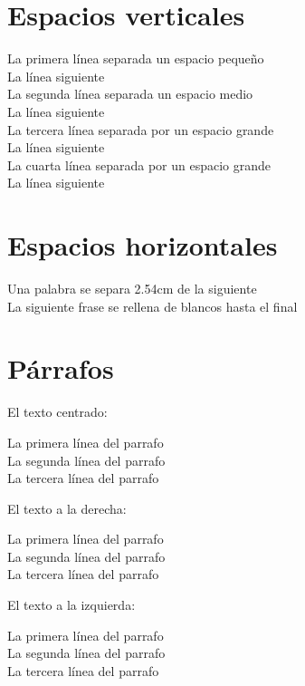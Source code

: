 \documentclass[10pt,a4paper]{article}
\begin{document}
\section{Espacios verticales}
La primera línea separada un espacio pequeño 
\smallskip \\
La línea siguiente \\
La segunda línea separada un espacio medio 
\medskip \\
La línea siguiente \\
La tercera línea separada por un espacio grande 
\bigskip \\
La línea siguiente \\
La cuarta línea separada por un espacio grande 
\vspace{3cm} \\
La línea siguiente 

\section{Espacios horizontales}
Una palabra se separa 2.54cm \hspace{2.54cm} de la siguiente \\
La siguiente frase se 
\hfill{rellena de blancos hasta el final}

\section{Párrafos}
El texto centrado:
\begin{center}
  La primera línea del parrafo 
  \vspace{2cm} \\
  La segunda línea del parrafo 
  \vspace{0.5cm} \\
  La tercera línea del parrafo \\ 

\end{center}
 El texto a la derecha:
\begin{flushright}
  La primera línea del parrafo \\
  La segunda línea del parrafo \\
  La tercera línea del parrafo \\ 
\end{flushright}

 El texto a la izquierda:
\begin{flushleft}
  La primera línea del parrafo \\
  La segunda línea del parrafo \\
  La tercera línea del parrafo \\ 
\end{flushleft}
\end{document}

